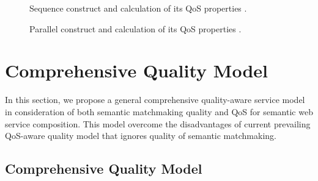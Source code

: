 \documentclass{IEEEtran}
\begin{document}
\begin{figure}[h]
\centerline{
}
\caption{Sequence construct and calculation of its QoS properties
\cite{yu2013adaptive}.}
\label{sequence}
\vspace{0.2cm}
\centerline{
}
\caption{Parallel construct and calculation of its QoS properties
\cite{yu2013adaptive}.}
\label{parallel}
\end{figure}





\section{Comprehensive Quality Model}\label{Comprehensive_Quality_Model}
In this section, we propose a general comprehensive quality-aware service model in consideration of both semantic matchmaking quality and QoS for semantic web service composition. This model overcome the disadvantages of current prevailing QoS-aware quality model that ignores quality of semantic matchmaking.


\subsection{Comprehensive Quality Model}\label{qualityModel}
\end{document}
